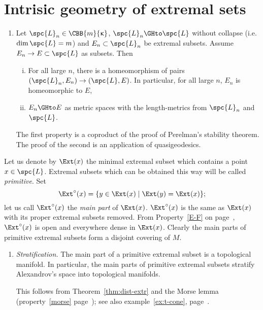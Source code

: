 \section{Intrisic geometry of extremal sets}

\begin{enumerate}
\item 
Let $\spc{L}_n\in\CBB{m}{\kappa}$, 
$\spc{L}_n\GHto \spc{L}$ without collapse 
(i.e. $\dim \spc{L}=m$) and $E_n\subset \spc{L}_n$ be extremal subsets. 
Assume $E_n\to E\subset \spc{L}$ as subsets. 
Then 
\begin{enumerate}[(i)]
\item\cite[9.1]{kapovitch:stability} \label{lim-dim-extr} For all large $n$, there is a homeomorphism of pairs $(\spc{L}_n,E_n)\to(\spc{L},E)$. 
In particular, for all large $n$, $E_n$ is homeomorphic to $E$, 
\item\cite[1.2]{petrunin:extremal}\label{lim-intr-extr} $E_n\GHto E$ as metric spaces with the
length-metrics from $\spc{L}_n$ and $\spc{L}$.
\end{enumerate}
The first property is a coproduct of the proof of Perelman's stability theorem.
The proof of the second is an application of quasigeodesics.
\end{enumerate}


Let us denote by $\Ext(x)$ the minimal extremal subset which contains a point
$x\in \spc{L}$. 
Extremal subsets which can be obtained this way will be called
\emph{primitive}. 
Set \[\Ext^\circ(x)=\{y\in \Ext(x)\mid\Ext(y)=\Ext(x)\};\]
let us call $\Ext^\circ(x)$ the \emph{main part} of $\Ext(x)$.
$\Ext^\circ(x)$ is the same as $\Ext(x)$ with its proper extremal subsets removed.
From Property~\ref{E-F} on page~\pageref{E-F},  $\Ext^\circ(x)$ is open and everywhere
dense in $\Ext(x)$.
Clearly the main parts of primitive extremal subsets form a disjoint
covering of $M$.

\begin{enumerate}
\item \cite[3.8]{perelman-petrunin:extremal} {\it Stratification.}\label{strata} The main part of a primitive extremal subset is a
topological manifold. In particular, the main parts of primitive extremal subsets
stratify Alexandrov's space into topological manifolds. 

This follows from Theorem~\ref{thm:dist-extr} and the Morse lemma (property~\ref{morse} page~\pageref{morse}); see also example~\ref{ex:t-cone}, page~\pageref{ex:t-cone}.
\end{enumerate}


